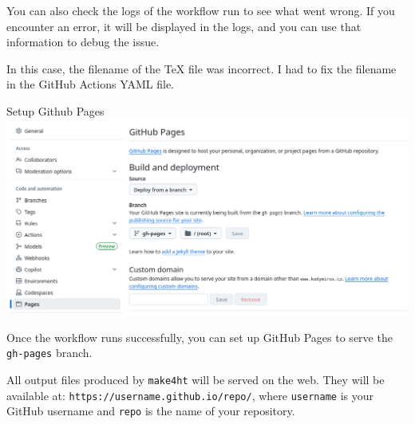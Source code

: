 You can also check the logs of the workflow run to see what went wrong.
If you encounter an error, it will be displayed in the logs, and you can use that
information to debug the issue.

In this case, the filename of the TeX file was incorrect. I had to fix the filename in the GitHub Actions YAML file.


\begin{frame}[fragile]{Setup Github Pages}
  \includegraphics[width=\textwidth]{img/github-pages.png}
\end{frame}

Once the workflow runs successfully, you can set up GitHub Pages to serve the \texttt{gh-pages} branch.

All output files produced by \texttt{make4ht} will be served on the web.
They will be available at:
\verb|https://username.github.io/repo/|,
where \texttt{username} is your GitHub username and \texttt{repo} is the name of your repository.

